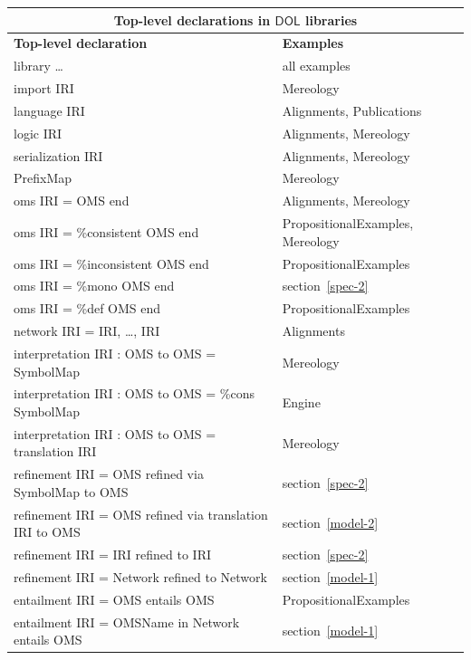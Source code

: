 \documentclass[10pt, a4paper]{isov2}
\makeatletter
\newcommand*\CommentAuthor{}
\renewcommand*\CommentAuthor{#1}}
\newcommand*\CommentDate{}
\renewcommand*\CommentDate{#1}}
\newcommand*\CommentId{}
\renewcommand*\CommentId{#1}}
\newcommand*\CommentType{}
\renewcommand*\CommentType{#1}}
\newcommand*{\SetCommentColorByType}[1]{%
\edef\localType{{#1}}%
\expandafter\ifstrequal\localType{q-aut}{\colorlet{CommentColor}{red}}{%
\expandafter\ifstrequal\localType{q-all}{\colorlet{CommentColor}{orange}}{%
\expandafter\ifstrequal\localType{todo}{\colorlet{CommentColor}{orange}}{%
\expandafter\ifstrequal\localType{fyi}{\colorlet{CommentColor}{lightgray}}{%
\colorlet{CommentColor}{yellow}}}}}}
\newcommand*{\SetCommentPrefixByType}[1]{%
\edef\localType{{#1}}%
\expandafter\@ifmtarg\localType{%
\edef\CommentPrefix{}%
}{%
\caseupper[q]{#1}%
\edef\CommentPrefix{\thestring: }%
}}
\newcommand*{\initComment}[1]{%
\setkeys{Comment}{#1}%
\SetCommentColorByType{\CommentType}%
\relax%
\SetCommentPrefixByType{\CommentType}%
\relax%
}
\newcommand*{\todonote}[2][]{%
\initComment{#1}%
\pdfcomment[author=\CommentAuthor,color=CommentColor,date=\CommentDate,id=\CommentId]{%
\CommentPrefix
#2}}
\renewcommand*{\todonote}[2][]{%
\initComment{#1}%
\ednote{\CommentPrefix #2}}
\newcommand*{\CLnote}[2][author=Christoph Lange]{%
\todonote[author=Christoph Lange,#1]{#2}}
\newcommand*{\DOL}{\ensuremath{\mathsf{DOL}}\xspace}
\makeatother
\begin{document}
\begin{tabular}{|l|l|}\hline
\multicolumn{2}{|c|}{\textbf{Top-level declarations in \DOL libraries}}\\\hline
\textbf{Top-level declaration} & \textbf{Examples} \\\hline
library \ldots & all examples\\\hline
import IRI & Mereology\\\hline
language IRI  & Alignments, Publications \\\hline
logic IRI  & Alignments, Mereology \\\hline
serialization IRI  & Alignments, Mereology \\\hline
PrefixMap  & Mereology \\\hline
oms IRI = OMS end  &  Alignments, Mereology \\\hline
oms IRI = \%consistent OMS end  & PropositionalExamples, Mereology \\\hline
oms IRI = \%inconsistent OMS end  & PropositionalExamples \\\hline
oms IRI = \%mono OMS end  & section~\ref{spec-2} \\\hline
oms IRI = \%def OMS end  & PropositionalExamples \\\hline
network IRI = IRI, \ldots, IRI & Alignments \\\hline
interpretation IRI : OMS to OMS = SymbolMap  & Mereology \\\hline
interpretation IRI : OMS to OMS = \%cons SymbolMap  &  Engine\\\hline
interpretation IRI : OMS to OMS = translation IRI  & Mereology \\\hline
refinement IRI = OMS refined via SymbolMap to OMS & section~\ref{spec-2} \\\hline
refinement IRI = OMS refined via translation IRI to OMS & section~\ref{model-2} \\\hline
refinement IRI = IRI refined to IRI & section~\ref{spec-2} \\\hline
refinement IRI = Network refined to Network & section~\ref{model-1} \\\hline
entailment IRI = OMS entails OMS & PropositionalExamples \\\hline
entailment IRI = OMSName in Network entails OMS & section~\ref{model-1}\\\hline

\end{tabular}
\end{document}
